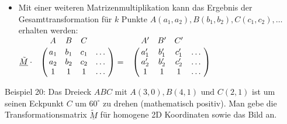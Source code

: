 \documentclass[a4paper]{scrartcl}
\begin{document}
\begin{itemize}
\item Mit einer weiteren Matrizenmultiplikation kann das Ergebnis der Gesamttransformation für $k$ Punkte $A(a_1,a_2),B(b_1,b_2),C(c_1,c_2), \dots $ erhalten werden:\\
$\underline{\tilde{M}} \cdot \bordermatrix{~ & A & B & C \cr
& a_1 & b_1 & c_1 & \dots \cr
&a_2 & b_2 & c_2 & \dots \cr
& 1 & 1 & 1 & \dots \cr} 
 =  \bordermatrix{~ & A' & B' & C' \cr
& a'_1 & b'_1 & c'_1 & \dots \cr
&a'_2 & b'_2 & c'_2 & \dots \cr
& 1 & 1 & 1 & \dots \cr}$ 
\end{itemize}

Beispiel 20: Das Dreieck $ABC$ mit $A(3,0), B(4,1) \text{ und } C(2,1)$ ist um seinen Eckpunkt $C$ um $60^\circ$ zu drehen (mathematisch positiv). Man gebe die Transformationsmatrix $\underline{\tilde{M}}$ für homogene 2D Koordinaten sowie das Bild an.\\
\end{document}
